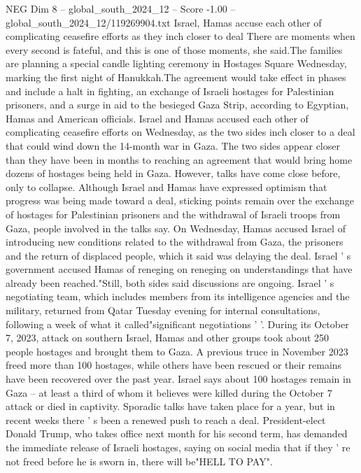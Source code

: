 \begin{textsample}{NEG Dim 8 – global\_south\_2024\_12 – Score -1.00 – global\_south\_2024\_12/119269904.txt}  \label{ex:f8_neg_386}
Israel, Hamas accuse each other of complicating ceasefire efforts as they inch closer to deal There are moments when every second is fateful, and this is one of those moments, she said.The families are planning a special candle lighting ceremony in Hostages Square Wednesday, marking the first night of Hanukkah.The agreement would take effect in phases and include a halt in fighting, an exchange of Israeli hostages for Palestinian prisoners, and a surge in aid to the besieged Gaza Strip, according to Egyptian, Hamas and American officials.
Israel and Hamas accused each other of complicating ceasefire efforts on Wednesday, as the two sides inch closer to a deal that could wind down the 14-month war in Gaza.
The two sides appear closer than they have been in months to reaching an agreement that would bring home dozens of hostages being held in Gaza.
However, talks have come close before, only to collapse.
Although Israel and Hamas have expressed optimism that progress was being made toward a deal, sticking points remain over the exchange of hostages for Palestinian prisoners and the withdrawal of Israeli troops from Gaza, people involved in the talks say.
On Wednesday, Hamas accused Israel of introducing new conditions related to the withdrawal from Gaza, the prisoners and the return of displaced people, which it said was delaying the deal.
Israel ' s government accused Hamas of reneging on reneging on understandings that have already been reached."Still, both sides said discussions are ongoing.
Israel ' s negotiating team, which includes members from its intelligence agencies and the military, returned from Qatar Tuesday evening for internal consultations, following a week of what it called"significant negotiations ' '.
During its October 7, 2023, attack on southern Israel, Hamas and other groups took about 250 people hostages and brought them to Gaza.
A previous truce in November 2023 freed more than 100 hostages, while others have been rescued or their remains have been recovered over the past year.
Israel says about 100 hostages remain in Gaza -- at least a third of whom it believes were killed during the October 7 attack or died in captivity.
Sporadic talks have taken place for a year, but in recent weeks there ' s been a renewed push to reach a deal.
President-elect Donald Trump, who takes office next month for his second term, has demanded the immediate release of Israeli hostages, saying on social media that if they ' re not freed before he is sworn in, there will be"HELL TO PAY".

\end{textsample}

